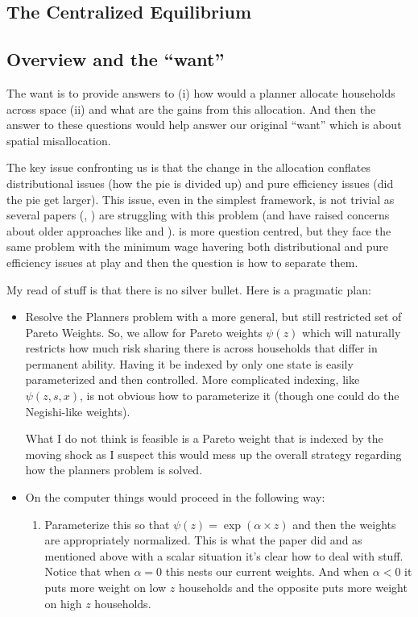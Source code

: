 \documentclass[12pt,pdftex]{article}
\begin{document}
\begin{onehalfspacing}
\newpage

\section{The Centralized Equilibrium}

\subsection{Overview and the ``want''}

The want is to provide answers to (i) how would a planner allocate households across space (ii) and what are the gains from this allocation. And then the answer to these questions would help answer our original ``want'' which is about spatial misallocation.

The key issue confronting us is that the change in the allocation conflates distributional issues (how the pie is divided up) and pure efficiency issues (did the pie get larger). This issue, even in the simplest \citet{aiya94} framework, is not trivial as several papers (\citet*{bhandari2021efficiency}, \citet{davila2022welfare}) are struggling with this problem (and have raised concerns about older approaches like \citet{benabou2002tax} and \citet{floden2001effectiveness}). \citet{berger2022minimum} is more question centred, but they face the same problem with the minimum wage havering both distributional and pure efficiency issues at play and then the question is how to separate them.

My read of stuff is that there is no silver bullet. Here is a pragmatic plan:
\begin{itemize}
\item Resolve the Planners problem with a more general, but still restricted set of Pareto Weights. So, we allow for Pareto weights $\psi(z)$ which will naturally restricts how much risk sharing there is across households that differ in permanent ability. Having it be indexed by only one state is easily parameterized and then controlled. More complicated indexing, like $\psi(z,s,x)$, is not obvious how to parameterize it (though one could do the Negishi-like weights).

    What I do not think is feasible is a Pareto weight that is indexed by the moving shock as I suspect this would mess up the overall strategy regarding how the planners problem is solved.

\item On the computer things would proceed in the following way:
\begin{enumerate}
\item Parameterize this so that $\psi(z) = \exp(\alpha\times z)$ and then the weights are appropriately normalized. This is what the \citet{bhandari2021efficiency} paper did and as mentioned above with a scalar situation it's clear how to deal with stuff. Notice that when $\alpha = 0$ this nests our current weights. And when $\alpha < 0$ it puts more weight on low $z$ households and the opposite puts more weight on high $z$ households.


\end{enumerate}
\end{itemize}
\end{onehalfspacing}
\end{document}
